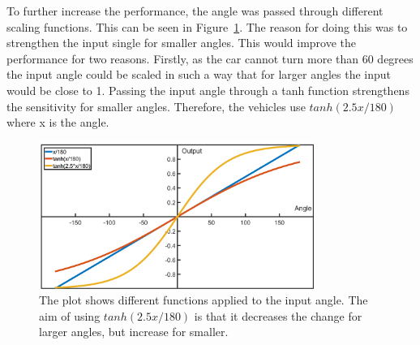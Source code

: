 To further increase the performance, the angle was passed through different scaling functions. This can be seen in Figure~\ref{06:anglePlot}. The reason for doing this was to strengthen the input single for smaller angles. This would improve the performance for two reasons. Firstly, as the car cannot turn more than 60 degrees the input angle could be scaled in such a way that for larger angles the input would be close to 1. Passing the input angle through a tanh function strengthens the sensitivity for smaller angles. Therefore, the vehicles use $tanh(2.5x/180)$ where x is the angle. 

\begin{figure}[h]
    \centering
    \includegraphics[width=0.8\textwidth]{06_Implementation/00_MLAgents/Images/anglePlot.png}
    \caption[Input angle functions]{The plot shows different functions applied to the input angle. The aim of using $tanh(2.5x/180)$ is that it decreases the change for larger angles, but increase for smaller.} \label{06:anglePlot}
\end{figure}


